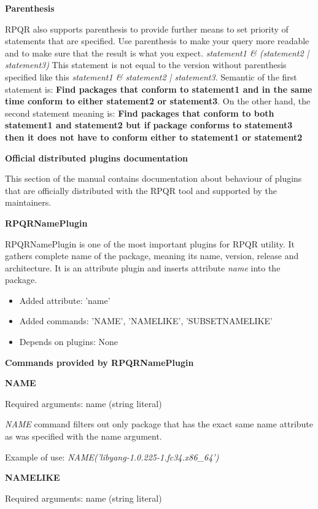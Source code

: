 \newpage

\textbf{Parenthesis}

RPQR also supports parenthesis to provide further means to set priority of statements that are specified.
Use parenthesis to make your query more readable and to make sure that the result is what you expect.
\textit{statement1 \& (statement2 | statement3)} This statement is not equal to the version without
parenthesis specified like this \textit{statement1 \& statement2 | statement3}. Semantic of the first
statement is: \textbf{Find packages that conform to statement1 and in the same time conform to either
statement2 or statement3}. On the other hand, the second statement meaning is: \textbf{Find packages
that conform to both statement1 and statement2 but if package conforms to statement3 then it does not
have to conform either to statement1 or statement2}

\textbf{Official distributed plugins documentation}

This section of the manual contains documentation about behaviour of plugins that are officially
distributed with the RPQR tool and supported by the maintainers.

\textbf{RPQRNamePlugin}

RPQRNamePlugin is one of the most important plugins for RPQR utility. It gathers complete name of the
package, meaning its name, version, release and architecture. It is an attribute plugin and inserts
attribute \textit{name} into the package.

\begin{itemize}
  \item Added attribute: 'name'
  \item Added commands: 'NAME', 'NAMELIKE', 'SUBSETNAMELIKE'
  \item Depends on plugins: None
\end{itemize}

\textbf{Commands provided by RPQRNamePlugin}

\textbf{NAME}

Required arguments: name (string literal)

\textit{NAME} command filters out only package that has the exact same name attribute as was specified
with the name argument.

Example of use: \textit{NAME('libyang-1.0.225-1.fc34.x86\_64')}

\textbf{NAMELIKE}

Required arguments: name (string literal)

